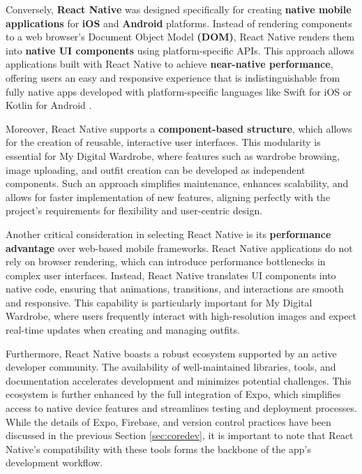 Conversely, \textbf{React Native} was designed specifically for creating \textbf{native mobile applications} for \textbf{iOS} and \textbf{Android} platforms. Instead of rendering components to a web browser’s Document Object Model \textbf{(DOM)}, React Native renders them into \textbf{native UI components} using platform-specific APIs. This approach allows applications built with React Native to achieve \textbf{near-native performance}, offering users an easy and responsive experience that is indistinguishable from fully native apps developed with platform-specific languages like Swift for iOS or Kotlin for Android \cite{reactnative}.

Moreover, React Native supports a \textbf{component-based structure}, which allows for the creation of reusable, interactive user interfaces. This modularity is essential for My Digital Wardrobe, where features such as wardrobe browsing, image uploading, and outfit creation can be developed as independent components. Such an approach simplifies maintenance, enhances scalability, and allows for faster implementation of new features, aligning perfectly with the project’s requirements for flexibility and user-centric design.

Another critical consideration in selecting React Native is its \textbf{performance advantage} over web-based mobile frameworks. React Native applications do not rely on browser rendering, which can introduce performance bottlenecks in complex user interfaces. Instead, React Native translates UI components into native code, ensuring that animations, transitions, and interactions are smooth and responsive. This capability is particularly important for My Digital Wardrobe, where users frequently interact with high-resolution images and expect real-time updates when creating and managing outfits.

Furthermore, React Native boasts a robust ecosystem supported by an active developer community\cite{reactnative}. The availability of well-maintained libraries, tools, and documentation accelerates development and minimizes potential challenges. This ecosystem is further enhanced by the full integration of Expo, which simplifies access to native device features and streamlines testing and deployment processes. While the details of Expo, Firebase, and version control practices have been discussed in the previous Section \ref{sec:coredev}, it is important to note that React Native’s compatibility with these tools forms the backbone of the app's development workflow.

